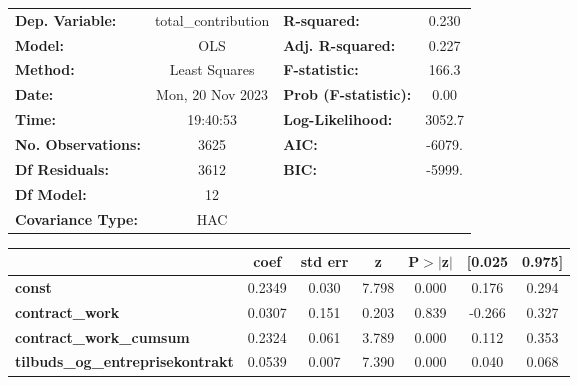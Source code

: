 \begin{center}
\begin{tabular}{lclc}
\toprule
\textbf{Dep. Variable:}                     & total\_contribution & \textbf{  R-squared:         } &     0.230   \\
\textbf{Model:}                             &         OLS         & \textbf{  Adj. R-squared:    } &     0.227   \\
\textbf{Method:}                            &    Least Squares    & \textbf{  F-statistic:       } &     166.3   \\
\textbf{Date:}                              &   Mon, 20 Nov 2023  & \textbf{  Prob (F-statistic):} &     0.00    \\
\textbf{Time:}                              &       19:40:53      & \textbf{  Log-Likelihood:    } &    3052.7   \\
\textbf{No. Observations:}                  &          3625       & \textbf{  AIC:               } &    -6079.   \\
\textbf{Df Residuals:}                      &          3612       & \textbf{  BIC:               } &    -5999.   \\
\textbf{Df Model:}                          &            12       & \textbf{                     } &             \\
\textbf{Covariance Type:}                   &         HAC         & \textbf{                     } &             \\
\bottomrule
\end{tabular}
\begin{tabular}{lcccccc}
                                            & \textbf{coef} & \textbf{std err} & \textbf{z} & \textbf{P$> |$z$|$} & \textbf{[0.025} & \textbf{0.975]}  \\
\midrule
\textbf{const}                              &       0.2349  &        0.030     &     7.798  &         0.000        &        0.176    &        0.294     \\
\textbf{contract\_work}                     &       0.0307  &        0.151     &     0.203  &         0.839        &       -0.266    &        0.327     \\
\textbf{contract\_work\_cumsum}             &       0.2324  &        0.061     &     3.789  &         0.000        &        0.112    &        0.353     \\
\textbf{tilbuds\_og\_entreprisekontrakt}    &       0.0539  &        0.007     &     7.390  &         0.000        &        0.040    &        0.068     \\

\end{tabular}
\end{center}
